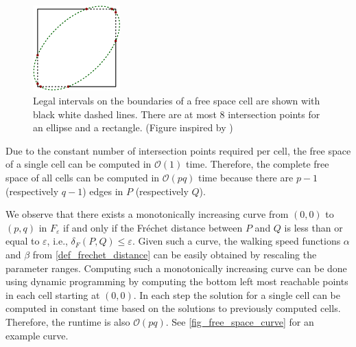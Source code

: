 \documentclass[
oneside,
fontsize=11pt
]{scrartcl}
\begin{document}
\begin{figure}[ht]
  \centering
  \includegraphics[width=0.3\textwidth]{images/frechet_distance/square-ellipse-intersection.pdf}
  \caption[Legal intervals on free space cell boundary]{
    Legal intervals on the boundaries of a free space cell are shown with black white dashed lines. 
    There are at most 8 intersection points for an ellipse and a rectangle. (Figure inspired by \cite{alt_computing_1995})}
  \label{fig_legal_boundary_intervals_of_a_cell}
\end{figure}

Due to the constant number of intersection points required per cell, 
the free space of a single cell can be computed in $\mathcal{O}(1)$ time.
Therefore, the complete free space of all cells can be computed in $\mathcal{O}(pq)$ time
because there are $p-1$ (respectively $q-1$) edges in $P$ (respectively $Q$).

We observe that there exists 
a monotonically increasing curve from $(0,0)$ to $(p,q)$ in $F_\varepsilon$
if and only if the Fréchet distance between $P$ and $Q$ is less than or equal to $\varepsilon$,
i.e., $\delta_F(P,Q) \leq \varepsilon$.
Given such a curve, the walking speed functions $\alpha$ and $\beta$ from \autoref{def_frechet_distance}
can be easily obtained by rescaling the parameter ranges. 
Computing such a monotonically increasing curve can be done using dynamic programming 
by computing the bottom left most reachable points in each cell starting at $(0,0)$. 
In each step the solution for a single cell can be computed in constant time based on the 
solutions to previously computed cells. 
Therefore, the runtime is also $\mathcal{O}(pq)$. 
See \autoref{fig_free_space_curve} for an example curve. \cite{alt_computing_1995}
\end{document}
